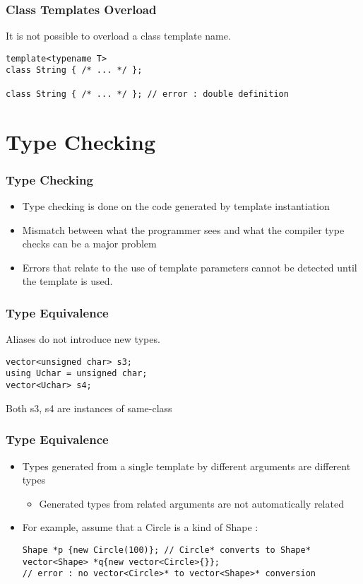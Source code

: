 \documentclass{beamer}
\begin{document}
\begin{frame}[fragile]
\frametitle{Class Templates Overload}
It is not possible to overload a class template name.
\begin{lstlisting}
template<typename T>
class String { /* ... */ };

class String { /* ... */ }; // error : double definition

\end{lstlisting}
\end{frame}


\section{Type Checking}
\begin{frame}
\frametitle{Type Checking}

\begin{itemize}
\item Type checking is done on the code generated by template instantiation
\item Mismatch between what the programmer sees and what the compiler type checks can be a major problem
\item Errors that relate to the use of template parameters cannot be detected until the template is used.
\end{itemize}

\end{frame}

\begin{frame}[fragile]
\frametitle{Type Equivalence}

Aliases do not introduce new types.

\begin{lstlisting}
vector<unsigned char> s3;
using Uchar = unsigned char;
vector<Uchar> s4;
\end{lstlisting}

Both s3, s4 are instances of same-class

\end{frame}

\begin{frame}[fragile]
\frametitle{Type Equivalence}

\begin{itemize}
\item Types generated from a single template by different arguments are different types
    \begin{itemize} 
    \item Generated types from related arguments are not automatically related
    \end{itemize}

\item For example, assume that a Circle is a kind of Shape :
\begin{lstlisting}
Shape *p {new Circle(100)}; // Circle* converts to Shape*
vector<Shape> *q{new vector<Circle>{}}; 
// error : no vector<Circle>* to vector<Shape>* conversion
\end{lstlisting}
\end{itemize}

\end{frame}
\end{document}
